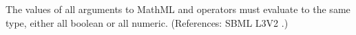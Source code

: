 The values of all arguments to MathML  and  operators
must evaluate to the same type, either all boolean or all numeric.
(References: SBML L3V2 .)
